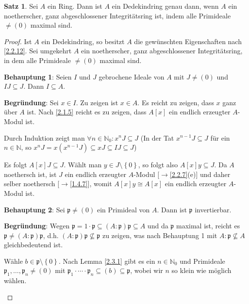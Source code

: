\documentclass[
twoside=semi,
fontsize=12,
DIV=12, 
cleardoublepage=current,
leqno,
headings=optiontoheadandtoc, 
toc=idx
]{scrbook}
\newcommand{\N}{\mathbb{N}}
\newcommand{\set}[1]{\left\{ #1 \right\}}
\theoremstyle{definition}
\newtheorem{satz}[definition]{Satz}
\begin{document}
   	\begin{satz}\label{2.3.2}
   		Sei $A$ ein Ring. Dann ist $A$ ein Dedekindring genau dann, wenn $A$ ein noetherscher, ganz abgeschlossener Integrit\"atsring ist, indem alle Primideale $\neq (0)$ maximal sind.
   			
   		\begin{proof}
   			Ist $A$ ein Dedekindring, so besitzt $A$ die gew\"unschten Eigenschaften nach \ref{2.2.12}. Sei umgekehrt $A$ ein noetherscher, ganz abgeschlossener Integrit\"atsring, in dem alle Primideale $\neq (0)$ maximal sind.
   			
   			\begin{tcolorbox}[colback=white,colframe=blue,arc=0cm]
	   			\textbf{Behauptung 1}: Seien $I$ und $J$ gebrochene Ideale von $A$ mit $J \neq (0)$ und $IJ \subseteq J$. Dann $I \subseteq A$.
	   				
	   			\tcblower
	   			\textbf{Begr\"undung}: Sei $x \in I$. Zu zeigen ist $x \in A$. Es reicht zu zeigen, dass $x$ ganz \"uber $A$ ist. Nach \ref{2.1.5} reicht es zu zeigen, dass $A[x]$ ein endlich erzeugter $A$-Modul ist. 
	   				
	   			Durch Induktion zeigt man $\forall n \in \N_0: x^nJ \subseteq J$  (In der Tat $x^{n-1}J \subseteq J$ f\"ur ein $n\in \N$, so $x^nJ = x(x^{n-1}J) \subseteq xJ \subseteq IJ \subseteq J$)
	   				
	   			Es folgt $A[x]J \subseteq J$. W\"ahlt man $y \in J \setminus \set{0}$, so folgt also $A[x]y \subseteq J$. Da $A$ noethersch ist, ist $J$ ein endlich erzeugter $A$-Modul [$\to$\ref{2.2.7}(e)] und daher selber noethersch [$\to$\ref{1.4.7}], womit $A[x]y \cong A[x]$ ein endlich erzeugter $A$-Modul ist.
   			\end{tcolorbox}
   			
   			\begin{tcolorbox}[colback=white,colframe=blue,arc=0cm]
	   			\textbf{Behauptung 2}: Sei $\mathfrak{p} \neq (0)$ ein Primideal von $A$. Dann ist $\mathfrak{p}$ invertierbar.
	   		
	   			\tcblower
	   			\textbf{Begründung}: Wegen $\mathfrak{p} = 1 \cdot \mathfrak{p} \subseteq (A:\mathfrak{p})\mathfrak{p} \subseteq A$ und da $\mathfrak{p}$ maximal ist, reicht es $\mathfrak{p} \neq (A:\mathfrak{p})\mathfrak{p}$, d.h. $(A:\mathfrak{p})\mathfrak{p} \nsubseteq \mathfrak{p}$ zu zeigen, was nach Behauptung 1 mit $A:\mathfrak{p} \nsubseteq A$ gleichbedeutend ist.
	   			
	   			\noindent W\"ahle $b \in \mathfrak{p} \setminus \set{0}$. Nach Lemma \ref{2.3.1} gibt es ein $n \in \N_0$ und Primideale $\mathfrak{p}_1, \dots, \mathfrak{p}_n \neq (0)$ mit $\mathfrak{p}_1 \cdot \cdots \cdot \mathfrak{p}_n \subseteq (b) \subseteq \mathfrak{p}$, wobei wir $n$ so klein wie m\"oglich w\"ahlen.
	   			

\end{tcolorbox}
\end{proof}
\end{satz}
\end{document}

